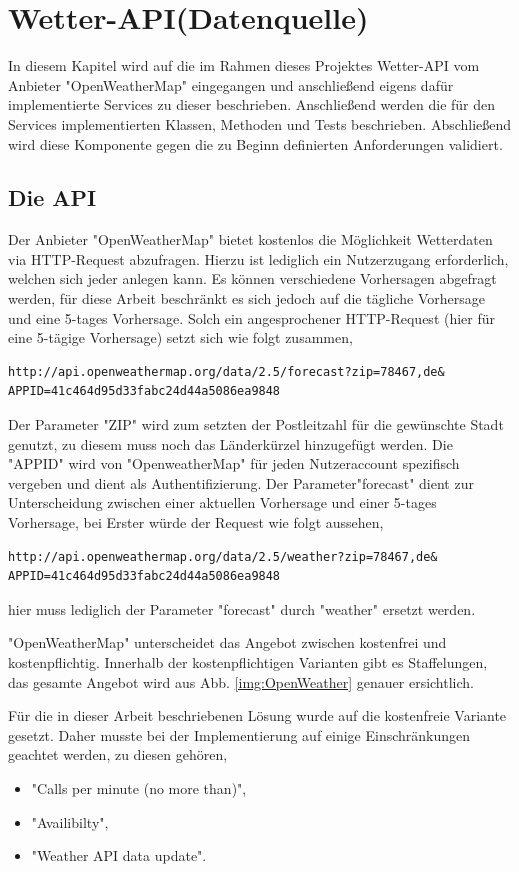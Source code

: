 \section{Wetter-API(Datenquelle)}
In diesem Kapitel wird auf die im Rahmen dieses Projektes Wetter-API vom Anbieter "OpenWeatherMap" eingegangen und anschließend eigens dafür implementierte Services zu dieser beschrieben. Anschließend werden die für den Services implementierten Klassen, Methoden und Tests beschrieben. Abschließend wird diese Komponente gegen die zu Beginn definierten Anforderungen validiert. 
\subsection{Die API}
Der Anbieter "OpenWeatherMap" bietet kostenlos die Möglichkeit Wetterdaten via HTTP-Request abzufragen. 
Hierzu ist lediglich ein Nutzerzugang erforderlich, welchen sich jeder anlegen kann. Es können verschiedene Vorhersagen abgefragt werden, für diese Arbeit beschränkt es sich jedoch auf die tägliche Vorhersage und eine  5-tages Vorhersage. Solch ein angesprochener HTTP-Request (hier für eine 5-tägige Vorhersage) setzt sich wie folgt zusammen, 
\begin{lstlisting}
http://api.openweathermap.org/data/2.5/forecast?zip=78467,de&
APPID=41c464d95d33fabc24d44a5086ea9848
\end{lstlisting}

Der Parameter "ZIP" wird zum setzten der Postleitzahl für die gewünschte Stadt genutzt, zu diesem muss noch das Länderkürzel hinzugefügt werden. Die "APPID" wird von "OpenweatherMap" für jeden Nutzeraccount spezifisch vergeben und dient als Authentifizierung. Der Parameter"forecast" dient zur Unterscheidung zwischen einer aktuellen Vorhersage und einer 5-tages Vorhersage, bei Erster würde der Request wie folgt aussehen, 

\begin{lstlisting}
http://api.openweathermap.org/data/2.5/weather?zip=78467,de&
APPID=41c464d95d33fabc24d44a5086ea9848
\end{lstlisting}

hier muss lediglich der Parameter "forecast" durch "weather" ersetzt werden. 

"OpenWeatherMap" unterscheidet das Angebot zwischen kostenfrei und kostenpflichtig. Innerhalb der kostenpflichtigen Varianten gibt es Staffelungen, das gesamte Angebot wird aus Abb. \ref{img:OpenWeather} genauer ersichtlich. 

Für die in dieser Arbeit beschriebenen Lösung wurde auf die kostenfreie Variante gesetzt. Daher musste bei der Implementierung auf einige Einschränkungen geachtet werden, zu diesen gehören, 
\begin{itemize}
\item "Calls per minute (no more than)",
\item "Availibilty",
\item "Weather API data update".
\end{itemize}

